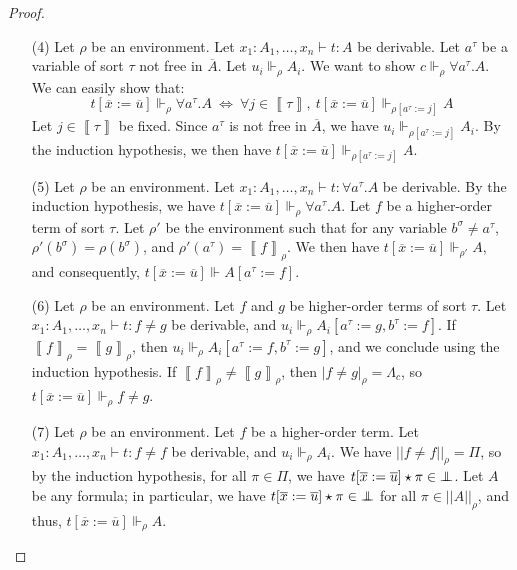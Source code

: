 \documentclass[a4paper,12pt]{article}
\theoremstyle{rmqstyle}
\newcommand{\abs}[1]{\lvert#1\rvert}
\newcommand{\abss}[1]{\lvert \lvert#1\rvert \rvert}
\newcommand{\itp}[1]{\left\llbracket#1\right\rrbracket}
\renewcommand{\iff}{\Leftrightarrow}
\newcommand{\pole}{{\protect\mathpalette{\protect\polehelper}{\bot}}} \def\polehelper#1#2{\mathrel{\rlap{$#1#2$}\mkern3mu{#1#2}}}
\renewcommand{\bar}{\overline}
\begin{document}
\begin{proof}
\begin{itemize}
\item[(4)] Let $\rho$ be an environment. Let $x_1 : A_1, \dots, x_n \vdash t : A$ be derivable. Let $a^\tau$ be a variable of sort $\tau$ not free in $\bar{A}$. Let $u_i \Vdash_\rho A_i$. We want to show $c \Vdash_\rho \forall a^\tau. A$.\\
We can easily show that:
$$t[\bar{x} := \bar{u}] \Vdash_\rho \forall a^\tau. A \ \iff \ \forall j \in \itp{\tau}, \ t[\bar{x} := \bar{u}] \Vdash_{\rho[a^\tau := j]} A$$
Let $j \in \itp{\tau}$ be fixed. Since $a^\tau$ is not free in $\bar{A}$, we have $u_i \Vdash_{\rho[a^\tau := j]} A_i$. By the induction hypothesis, we then have $t[\bar{x} := \bar{u}] \Vdash_{\rho[a^\tau := j]} A$.\\

\item[(5)] Let $\rho$ be an environment. Let $x_1 : A_1, \dots, x_n \vdash t : \forall a^\tau.A$ be derivable. By the induction hypothesis, we have $t[\bar{x} := \bar{u}] \Vdash_\rho \forall a^\tau.A$. Let $f$ be a higher-order term of sort $\tau$. Let $\rho'$ be the environment such that for any variable $b^\sigma \neq a^\tau$, $\rho'(b^\sigma) = \rho(b^\sigma)$, and $\rho'(a^\tau) = \itp{f}_\rho$. We then have $t[\bar{x} := \bar{u}] \Vdash_{\rho'} A$, and consequently, $t[\bar{x} := \bar{u}] \Vdash A[a^\tau := f]$.\\

\item[(6)] Let $\rho$ be an environment. Let $f$ and $g$ be higher-order terms of sort $\tau$. Let $x_1 : A_1, \dots, x_n \vdash t : f \neq g$ be derivable, and $u_i \Vdash_\rho A_i[a^\tau := g, b^\tau := f]$. If $\itp{f}_\rho = \itp{g}_\rho$, then $u_i \Vdash_\rho A_i[a^\tau := f, b^\tau := g]$, and we conclude using the induction hypothesis. If $\itp{f}_\rho \neq \itp{g}_\rho$, then $\abs{f \neq g}_\rho = \Lambda_c$, so $t[\bar{x} := \bar{u}] \Vdash_\rho f \neq g$.\\

\item[(7)] Let $\rho$ be an environment. Let $f$ be a higher-order term. Let $x_1 : A_1, \dots, x_n \vdash t : f \neq f$ be derivable, and $u_i \Vdash_\rho A_i$. We have $\abss{f \neq f}_\rho = \Pi$, so by the induction hypothesis, for all $\pi \in \Pi$, we have $t[\bar{x} := \bar{u}] \star \pi \in \pole$. Let $A$ be any formula; in particular, we have $t[\bar{x} := \bar{u}] \star \pi \in \pole$ for all $\pi \in \abss{A}_\rho$, and thus, $t[\bar{x} := \bar{u}] \Vdash_\rho A$.\\


\end{itemize}
\end{proof}
\end{document}
